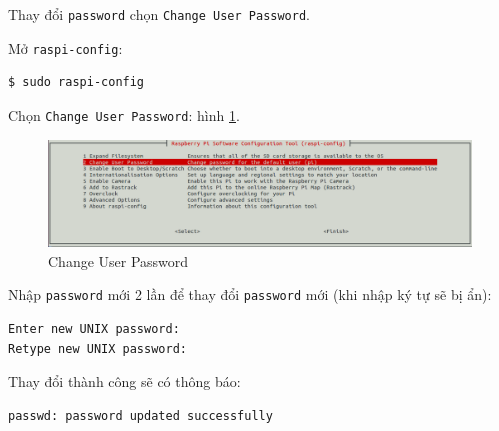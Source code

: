 \documentclass[12pt,a4paper]{article}
\begin{document}
	Thay đổi \verb|password| chọn \verb|Change User Password|.
	\begin{list}{--}{}
		\item Mở \verb|raspi-config|:
			\begin{lstlisting}[language=bash]
$ sudo raspi-config
			\end{lstlisting}
			
		\item Chọn \verb|Change User Password|: hình \ref{Fig:Change-user-pass}.
			\begin{figure}[!h]
				\begin{center}
					\includegraphics[scale=.3]{Change-user-pass.png} 
				\end{center}
				\caption{Change User Password}\label{Fig:Change-user-pass}
			\end{figure}
			
		\item Nhập \verb|password| mới 2 lần để thay đổi \verb|password| mới (khi nhập ký tự sẽ bị ẩn):
			\begin{lstlisting}[language=bash]
Enter new UNIX password:
Retype new UNIX password:
			\end{lstlisting}
						
		\item Thay đổi thành công sẽ có thông báo:
			\begin{lstlisting}[language=bash]
passwd: password updated successfully
			\end{lstlisting}
	\end{list}
	
\end{document}
